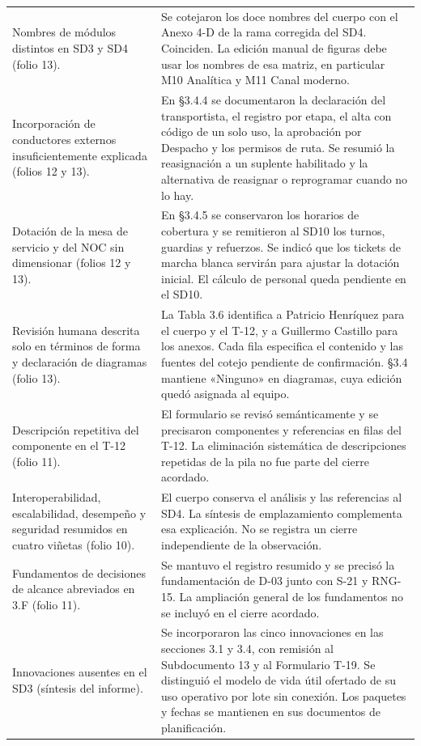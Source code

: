 \documentclass[11pt,letterpaper]{article}
\begin{document}
\begin{longtable}{@{}P{0.33\textwidth}P{\tabcolsep\relax}@{}}
Nombres de módulos distintos en SD3 y SD4 (folio 13). &
Se cotejaron los doce nombres del cuerpo con el Anexo 4-D de la rama corregida del SD4. Coinciden. La edición manual de figuras debe usar los nombres de esa matriz, en particular M10 Analítica y M11 Canal moderno. \\
Incorporación de conductores externos insuficientemente explicada (folios 12 y 13). &
En §3.4.4 se documentaron la declaración del transportista, el registro por etapa, el alta con código de un solo uso, la aprobación por Despacho y los permisos de ruta. Se resumió la reasignación a un suplente habilitado y la alternativa de reasignar o reprogramar cuando no lo hay. \\
Dotación de la mesa de servicio y del NOC sin dimensionar (folios 12 y 13). &
En §3.4.5 se conservaron los horarios de cobertura y se remitieron al SD10 los turnos, guardias y refuerzos. Se indicó que los tickets de marcha blanca servirán para ajustar la dotación inicial. El cálculo de personal queda pendiente en el SD10. \\
Revisión humana descrita solo en términos de forma y declaración de diagramas (folio 13). &
La Tabla 3.6 identifica a Patricio Henríquez para el cuerpo y el T-12, y a Guillermo Castillo para los anexos. Cada fila especifica el contenido y las fuentes del cotejo pendiente de confirmación. §3.4 mantiene «Ninguno» en diagramas, cuya edición quedó asignada al equipo. \\
Descripción repetitiva del componente en el T-12 (folio 11). &
El formulario se revisó semánticamente y se precisaron componentes y referencias en filas del T-12. La eliminación sistemática de descripciones repetidas de la pila no fue parte del cierre acordado. \\
Interoperabilidad, escalabilidad, desempeño y seguridad resumidos en cuatro viñetas (folio 10). &
El cuerpo conserva el análisis y las referencias al SD4. La síntesis de emplazamiento complementa esa explicación. No se registra un cierre independiente de la observación. \\
Fundamentos de decisiones de alcance abreviados en 3.F (folio 11). &
Se mantuvo el registro resumido y se precisó la fundamentación de D-03 junto con S-21 y RNG-15. La ampliación general de los fundamentos no se incluyó en el cierre acordado. \\
Innovaciones ausentes en el SD3 (síntesis del informe). &
Se incorporaron las cinco innovaciones en las secciones 3.1 y 3.4, con remisión al Subdocumento 13 y al Formulario T-19. Se distinguió el modelo de vida útil ofertado de su uso operativo por lote sin conexión. Los paquetes y fechas se mantienen en sus documentos de planificación. \\
\end{longtable}
\end{document}
